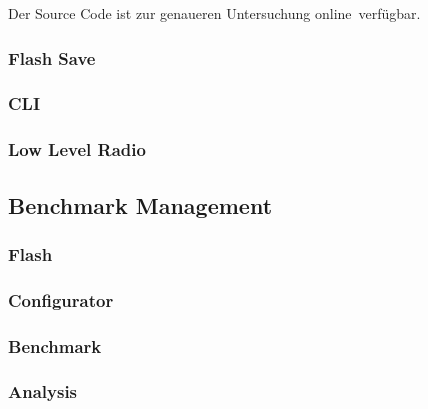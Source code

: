 Der Source Code ist zur genaueren Untersuchung online\footnotemark\ verfügbar. 


\subsubsection{Flash Save}\label{subsubsec:FlashSave}

\subsubsection{CLI}\label{subsubsec:CLI}

\subsubsection{Low Level Radio}\label{subsubsec:LowLevelRadio}


\subsection{Benchmark Management}\label{subsec:Benchmark Management}

\subsubsection{Flash}\label{subsubsec:Flash}

\subsubsection{Configurator}\label{subsubsec:Configurator}

\subsubsection{Benchmark}\label{subsubsec:Benchmark}

\subsubsection{Analysis}\label{subsubsec:Analysis}

